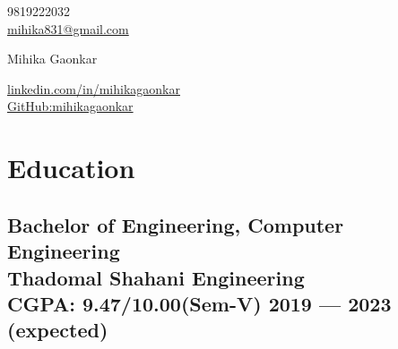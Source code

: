 \documentclass[10pt]{article}
\begin{document}
\begin{center}
    \begin{minipage}[b]{0.24\textwidth}
            \large 9819222032 \\
            \large \href{mailto:mihika831@gmail.com}{mihika831@gmail.com} 
    \end{minipage}%
    \begin{minipage}[b]{0.44\textwidth}
            \centering
            {\HUGE Mihika Gaonkar} \\ %
            \vspace{0.1cm}
            {\color{UI_blue} \Large{}} 
    \end{minipage}%
    \begin{minipage}[b]{0.30\textwidth}
            \flushright \large  %
            {\href{https://www.linkedin.com/in/mihikagaonkar/}{linkedin.com/in/mihikagaonkar} } \\
            \href{https://github.com/mihikagaonkar/}{GitHub:mihikagaonkar}
    \end{minipage}   
    
\vspace{-0.15cm} 
\end{center}






\section{Education }
\subsection*{Bachelor of Engineering, Computer Engineering\\ {\normalsize \normalfont Thadomal Shahani Engineering\\ CGPA: 9.47/10.00(Sem-V)} \hfill  2019 ---  2023 (expected)} 
\vspace{0.2cm}

\end{document}
